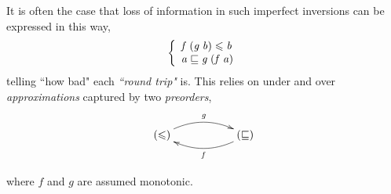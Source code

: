 \documentclass{elsarticle}
\makeatletter
\newcommand{\Varid}[1]{\mathit{#1}}
\renewcommand{\leq}{\leqslant}
\newenvironment{lcbr}{\left\{\begin{array}{l}}{\end{array}\right.}
\def\arLaw#1#2#3#4#5{
\xymatrix{
        #1      \ar@/^1pc/[rr]^-{#4} &
        #5 &
        #2      \ar@/^1pc/[ll]^-{#3}
}}
\def\arLaw#1#2#3#4#5{
\xymatrix{
        #1      \ar@/^1pc/[rr]^-{#4} &
        #5 &
        #2      \ar@/^1pc/[ll]^-{#3}
}}
\makeatother
\begin{document}
It is often the case that loss of information in such imperfect inversions
can be expressed in this way,
\begin{eqnarray}
\ensuremath{\begin{lcbr}\Varid{f}\;(\Varid{g}\;\Varid{b})\leq \Varid{b}\\\Varid{a}\sqsubseteq \Varid{g}\;(\Varid{f}\;\Varid{a})\end{lcbr}}
	\label{eq:220625a}
\end{eqnarray}
telling ``how bad" each \emph{``round trip"} is. This relies on
under and over \emph{approximations} captured by two \emph{preorders},
\begin{eqnarray*}
        \arLaw{\ensuremath{(\leq )}}{\ensuremath{(\sqsubseteq )}}{\ensuremath{\Varid{f}}}{\ensuremath{\Varid{g}}}{}
\end{eqnarray*}
%
%
where \ensuremath{\Varid{f}} and \ensuremath{\Varid{g}} are assumed  monotonic.
\end{document}
